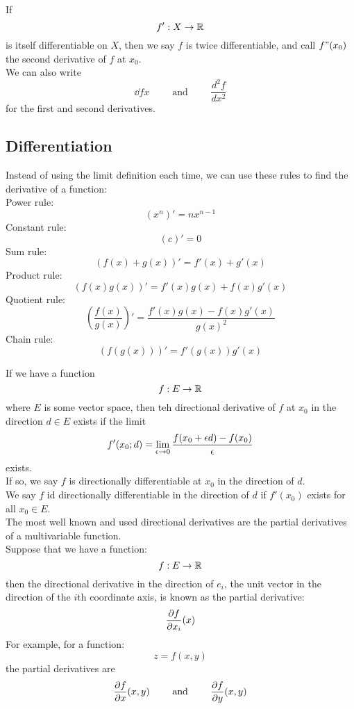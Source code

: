 \documentclass[12pt]{article}
\begin{document}
    If
    \[f': X \to \mathbb{R} \]
    is itself differentiable on $X$,
    then we say $f$ is twice differentiable,
    and call $f"(x_0)$ the second derivative
    of $f$ at $x_0$. \\

    We can also write
    \[ \dd{f}{x} \qquad \text{ and } \qquad \dfrac{d^2f}{dx^2} \]
    for the first and second derivatives. \\

    \newpage

    \subsection*{Differentiation}

    Instead of using the limit definition each time,
    we can use these rules to find the derivative
    of a function: \\
    Power rule: \[ (x^n)' = nx^{n-1} \]
    Constant rule: \[ (c)' = 0  \]
    Sum rule: \[ (f(x) + g(x))' = f'(x) + g'(x) \]
    Product rule: \[ (f(x)g(x))' = f'(x)g(x) + f(x)g'(x) \]
    Quotient rule: \[ \left(\dfrac{f(x)}{g(x)}\right)' =
    \dfrac{f'(x)g(x) - f(x)g'(x)}{g(x)^2} \]
    Chain rule: \[ (f(g(x)))' = f'(g(x))g'(x) \]

    If we have a function
    \[ f: E \to \mathbb{R} \]
    where $E$ is some vector space,
    then teh directional derivative of $f$
    at $x_0$ in the direction $d \in E$
    exists if the limit
    \[ f'(x_0; d) = \lim_{\epsilon \to 0} 
        \dfrac{f(x_0+\epsilon d) - f(x_0)}{\epsilon}
   \]
    exists. \\
    If so, we say $f$ is directionally differentiable
    at $x_0$ in the direction of $d$. \\
    We say $f$ id directionally differentiable
    in the direction of $d$
    if $f'(x_0)$ exists for all $x_0 \in E$. \\

    The most well known and used directional
    derivatives are the partial derivatives of a
    multivariable function. \\
    Suppose that we have a function:
    \[ f: E \to \mathbb{R} \]
    then the directional derivative in the direction 
    of $e_i$,
    the unit vector in the direction of the $i$th
    coordinate axis,
    is known as the partial derivative:
    \[ \dfrac{\partial f}{\partial x_i}(x)\]
    For example, for a function:
    \[ z = f(x, y) \]
    the partial derivatives are
    \[ \dfrac{\partial f}{\partial x}(x, y) \qquad \text{ and } 
    \qquad \dfrac{\partial f}{\partial y}(x, y) \]
\end{document}
